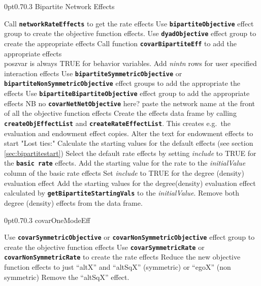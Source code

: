 \documentclass[12pt,a4paper]{article}
\makeatletter
\renewcommand{\=}{\,=\,}
\newcommand{\+}{\,+\,}
\newcommand{\nnm}[1]{\textsf{\textit{#1}}}
\renewcommand{\subsection}{\@startsection{subsection}{2}
                {0pt}{0.7\baselineskip}{0.3\baselineskip}
                {\sffamily} }
\newcommand{\sfn}[1]{\textbf{\texttt{#1}}}
\makeatother
\begin{document}
\subsection{Bipartite Network Effects}
\begin{algorithmic}
  \STATE Call \sfn{networkRateEffects} to get the rate effects
  \STATE Use \sfn{bipartiteObjective} effect group to create the objective
  function effects.
  \STATE Use \sfn{dyadObjective} effect group to create the appropriate effects
  \ENDFOR
  \STATE Call function \sfn{covarBipartiteEff} to add the appropriate effects\\
  poszvar is always TRUE for behavior variables.
  \ENDFOR
  \STATE Add \nnm{nintn} rows for user specified interaction effects
  \ENDIF
  \STATE Use \sfn{bipartiteSymmetricObjective} or
  \sfn{bipartiteNonSymmetricObjective} effect groups to add the appropriate
the effects
  \STATE Use \sfn{bipartiteBipartiteObjective} effect group to add the
  appropriate  effects
  \ENDIF
  \STATE NB no \sfn{covarNetNetObjective} here?
  \ENDFOR
  \STATE paste the network name at the front of all the objective function
  effects
  \ENDIF
  \STATE Create the effects data frame by calling \sfn{createObjEffectList} and
  \sfn{createRateEffectList}.  This creates e.g.\ the evaluation and endowment
  effect copies.
  \STATE Alter the text for endowment effects to start "Lost ties:"
  \STATE Calculate the starting values for the default effects
  (see section \ref{sec:bipartitestart})
  \STATE Select the default rate effects by setting \nnm{include} to TRUE for
  the \sfn{basic rate} effects.
  \STATE Add the starting value for the rate to the \nnm{initialValue} column
  of the basic rate effects
  \STATE  Set \nnm{include} to TRUE for the degree (density) evaluation effect
  \STATE Add the starting values for the degree(density) evaluation effect
  calculated by \sfn{getBipartiteStartingVals} to the \nnm{initialValue}.
  \ELSE
  \STATE Remove both degree (density) effects from the data frame.
  \ENDIF
\end{algorithmic}
\subsection{covarOneModeEff}
\begin{algorithmic}
\STATE Use \sfn{covarSymmetricObjective} or \sfn{covarNonSymmetricObjective}
effect group to create the objective function effects
\STATE Use \sfn{covarSymmetricRate} or \sfn{covarNonSymmetricRate} to create the
rate effects
\STATE Reduce the new objective function effects to just ``altX'' and ``altSqX'' (symmetric)
or ``egoX'' (non symmetric)
\ENDIF
{}
\STATE Remove the ``altSqX'' effect.
\ENDIF
\end{algorithmic}
\end{document}
